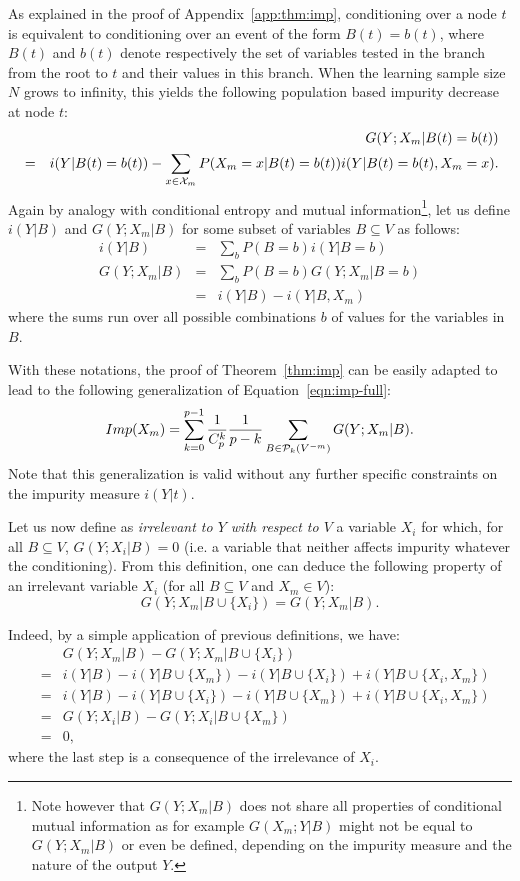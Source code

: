 \documentclass{article}
\begin{document}
As explained in the proof of Appendix~\ref{app:thm:imp}, conditioning
over a node $t$ is equivalent to conditioning over an event of the
form $B(t)=b(t)$, where $B(t)$ and $b(t)$ denote respectively the set
of variables tested in the branch from the root to $t$ and their
values in this branch. When the learning sample size $N$ grows to
infinity, this yields the following population based impurity decrease
at node $t$:
\begin{eqnarray*}
&&G(Y;X_m|B(t)=b(t))\nonumber \\
& = & i(Y|B(t)=b(t))-\sum_{x\in{\cal X}_m}
P(X_m=x|B(t)=b(t)) i(Y|B(t)=b(t),X_m=x).\nonumber \\\label{eqn:imppop}
\end{eqnarray*}
Again by analogy with conditional entropy and mutual
information\footnote{Note however that $G(Y;X_m|B)$ does not share all
  properties of conditional mutual information as for example $G(X_m;
  Y|B)$ might not be equal to $G(Y; X_m|B)$ or even be defined,
  depending on the impurity measure and the nature of the output
  $Y$.}, let us define $i(Y|B)$ and $G(Y;X_m|B)$ for some subset of
variables $B\subseteq V$ as follows:
\begin{eqnarray*}
i(Y|B)&=&\sum_{b} P(B=b) i(Y|B=b)\\
G(Y;X_m|B)&=& \sum_{b} P(B=b) G(Y;X_m|B=b)\\
&=&i(Y|B)-i(Y|B,X_m)
\end{eqnarray*}
where the sums run over all possible combinations $b$ of values for
the variables in $B$.

With these notations, the proof of Theorem~\ref{thm:imp} can be easily adapted to lead
to the following generalization of Equation~\ref{eqn:imp-full}:
\begin{equation}
Imp(X_m)=\sum_{k=0}^{p-1} \frac{1}{C_p^k} \frac{1}{p-k} \sum_{B \in
  {\cal P}_k(V^{-m})} G(Y;X_m|B).
\end{equation}
Note that this generalization is valid without any further specific constraints
on the impurity measure $i(Y|t)$.

Let us now define as {\it irrelevant to $Y$ with respect to $V$} a
variable $X_i$ for which, for all $B\subseteq V$,
$G(Y;X_i|B)=0$ (i.e. a variable that neither affects impurity
whatever the conditioning). From this definition, one can deduce the
following property of an irrelevant variable $X_i$ (for all
$B\subseteq V$ and $X_m\in V$):
$$G(Y;X_m|B\cup\{X_i\})=G(Y;X_m|B).$$

Indeed, by a simple application of previous definitions, we have:
\begin{eqnarray*}
&&G(Y;X_m|B)-G(Y;X_m|B\cup\{X_i\})\nonumber\\
& = & i(Y|B)-i(Y|B\cup\{X_m\})-i(Y|B\cup\{X_i\})+i(Y|B\cup\{X_i,X_m\})\\
& = & i(Y|B)-i(Y|B\cup\{X_i\})-i(Y|B\cup\{X_m\})+i(Y|B\cup\{X_i,X_m\})\\
& = & G(Y;X_i|B)-G(Y;X_i|B\cup\{X_m\})\\
& = & 0,
\end{eqnarray*}
where the last step is a consequence of the irrelevance of $X_i$.
\end{document}
